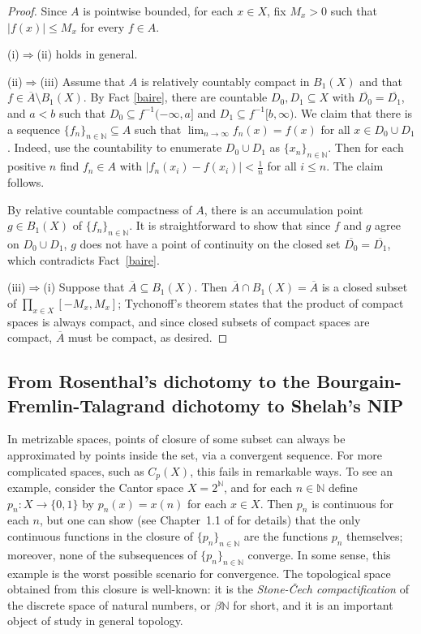 \documentclass[psamsfonts]{amsart}
\theoremstyle{definition}
\theoremstyle{remark}
\numberwithin{equation}{section}
\begin{document}
\begin{proof}
    Since $A$ is pointwise bounded, for each $x\in X$, fix $M_x>0$ such that $|f(x)|\leq M_x$ for every $f\in A$.

    (i)$\Rightarrow$(ii) holds in general.


    (ii)$\Rightarrow$(iii) Assume that $A$ is relatively countably compact in $B_1(X)$ and that $f\in\overline A\setminus B_1(X)$.
By Fact \ref{baire}, there are countable $D_0,D_1\subseteq X$ with $\overline {D_0}=\overline{D_1}$, and $a<b$ such that $D_0\subseteq f^{-1}(-\infty,a]$ and $D_1\subseteq f^{-1}[b,\infty)$.
We claim that there is a sequence $\{f_n\}_{n\in\mathbb{N}}\subseteq A$ such that $\lim_{n\to\infty}f_n(x)=f(x)$ for all $x\in D_0\cup D_1$.
Indeed, use the countability to enumerate $D_0\cup D_1$ as $\{x_n\}_{n\in\mathbb{N}}$.
Then for each positive $n$ find  $f_n\in A$ with $|f_n(x_i)-f(x_i)|<\frac1n$ for all $i\leq n$.
The claim follows.

    By relative countable compactness of $A$, there is an accumulation point $g\in B_1(X)$ of $\{f_n\}_{n\in\mathbb{N}}$.
It is straightforward to show that since $f$ and $g$ agree on $D_0\cup D_1$, $g$ does not have a point of continuity on the closed set $\overline{D_0}=\overline{D_1}$, which contradicts Fact~\ref{baire}.

    (iii)$\Rightarrow$(i) Suppose that $\overline A\subseteq B_1(X)$.
Then $\overline{A}\cap B_1(X)=\overline A$ is a closed subset of $\prod_{x\in X}[-M_x,M_x]$; Tychonoff's theorem states that the product of compact spaces is always compact, and since closed subsets of compact spaces are compact, $\overline A$ must be compact, as desired.
\end{proof}

\subsection{From Rosenthal's dichotomy to the Bourgain-Fremlin-Talagrand dichotomy to Shelah's NIP}

In metrizable spaces, points of closure of some subset can always be approximated by points inside the set, via a convergent sequence.
For more complicated spaces, such as $C_p(X)$, this fails in remarkable  ways.
To see an example, consider the Cantor space $X=2^\mathbb{N}$, and for each $n\in\mathbb{N}$ define $p_n:X\to\{0,1\}$ by  $p_n(x)=x(n)$ for each $x\in X$.
Then $p_n$ is continuous for each $n$,  but one can show (see Chapter~1.1 of \cite{Todorcevic_1997_TopicsTop} for details) that the only continuous functions in the closure of $\{p_n\}_{n\in\mathbb{N}}$ are the functions $p_n$ themselves; moreover, none of the subsequences of $\{p_n\}_{n\in\mathbb{N}}$ converge.
In some sense, this example is the worst possible scenario for convergence.
The topological space obtained from this closure is well-known: it is the \emph{Stone-Čech compactification} of the discrete space of natural numbers, or $\beta\mathbb{N}$ for short, and it is an important object of study in general topology.
\end{document}
